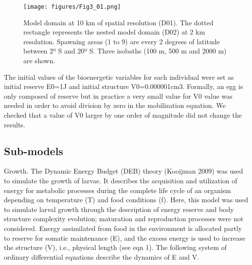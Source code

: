 \begin{figure}[ht]
	\texttt{[image: figures/Fig3\_01.png]}
	\centering
	\caption{Model domain at 10 km of spatial resolution (D01). The dotted rectangle represents the nested model domain (D02) at 2 km resolution. Spawning areas (1 to 9) are every 2 degrees of latitude between 2º S and 20º S. Three isobaths (100 m, 500 m and 2000 m) are shown.}
	\label{Fig3_01}
\end{figure}

The initial values of the bioenergetic variables for each individual were set as initial
reserve E0=1J and initial structure V0=0.000001cm3. Formally, an egg is only composed
of reserve but in practice a very small value for V0 value was needed in order to avoid
division by zero in the mobilization equation. We checked that a value of V0 larger by one order of magnitude did not change the results.

\subsection{Sub-models}
Growth. The Dynamic Energy Budget (DEB) theory (Kooijman 2009) was used to simulate the growth of larvae. It describes the acquisition and utilization of energy for metabolic processes during the complete life cycle of an organism depending on temperature (T) and food conditions (f). Here, this model was used to simulate larval growth through the description of energy reserve and body structure complexity evolution; maturation and reproduction processes were not considered. Energy assimilated from food in the environment is allocated partly to reserve for somatic maintenance (E), and the excess energy is used to increase the structure (V), i.e., physical length (see eqn 1). The following system of ordinary differential equations describe the dynamics of E and V.


